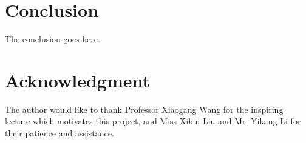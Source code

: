 \section{Conclusion}
The conclusion goes here.

\section*{Acknowledgment}

The author would like to thank Professor Xiaogang Wang for the inspiring lecture which motivates this project, and Miss Xihui Liu and Mr. Yikang Li for their patience and assistance.